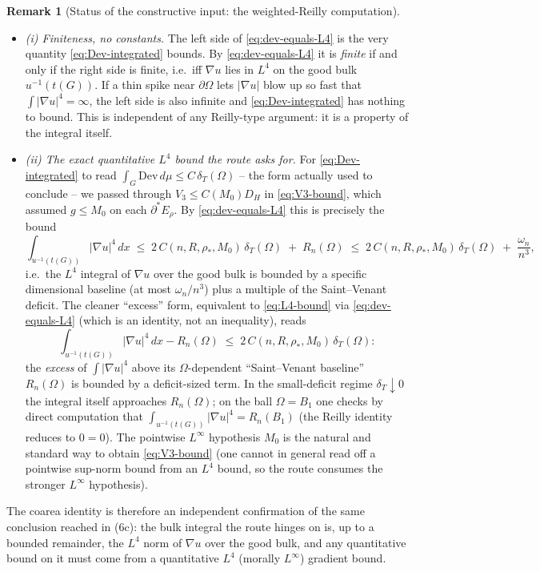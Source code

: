 \documentclass[11pt]{amsart}
\theoremstyle{definition}
\newtheorem{remark}[theorem]{Remark}
\newcommand{\Om}{\Omega}
\newcommand{\dT}{\delta_T}
\newcommand{\rstar}{\rho_*}
\begin{document}
\begin{remark}[Status of the constructive input: the weighted-Reilly computation]
\begin{itemize}[leftmargin=2em]
\item \emph{(i) Finiteness, no constants.}  The left side of
\eqref{eq:dev-equals-L4} is the very quantity \eqref{eq:Dev-integrated} bounds.
By \eqref{eq:dev-equals-L4} it is \emph{finite} if and only if the right side is
finite, i.e.\ iff \(\nabla u\) lies in \(L^4\) on the good bulk
\(u^{-1}(t(G))\).  If a thin spike near \(\partial\Om\) lets \(|\nabla u|\) blow
up so fast that \(\int|\nabla u|^4=\infty\), the left side is also infinite and
\eqref{eq:Dev-integrated} has nothing to bound.  This is independent of any
Reilly-type argument: it is a property of the integral itself.
\item \emph{(ii) The exact quantitative \(L^4\) bound the route asks for.}
For \eqref{eq:Dev-integrated} to read
\(\int_G\mathrm{Dev}\,d\mu\le C\,\dT(\Om)\) -- the form actually used to
conclude -- we passed through \(V_3\le C(M_0)D_H\) in \eqref{eq:V3-bound},
which assumed \(g\le M_0\) on each \(\partial^*E_\rho\).  By
\eqref{eq:dev-equals-L4} this is precisely the bound
\begin{equation}\label{eq:L4-bound}
   \int_{u^{-1}(t(G))}|\nabla u|^4\,dx
   \;\le\;
   2\,C(n,R,\rstar,M_0)\,\dT(\Om)\;+\;R_n(\Om)
   \;\le\;
   2\,C(n,R,\rstar,M_0)\,\dT(\Om)\;+\;\frac{\omega_n}{n^3} ,
\end{equation}
i.e.\ the \(L^4\) integral of \(\nabla u\) over the good bulk is bounded by a
specific dimensional baseline (at most \(\omega_n/n^3\)) plus a multiple of the
Saint--Venant deficit.  The cleaner ``excess'' form, equivalent to
\eqref{eq:L4-bound} via \eqref{eq:dev-equals-L4} (which is an identity, not an
inequality), reads
\[
   \int_{u^{-1}(t(G))}|\nabla u|^4\,dx-R_n(\Om)
   \;\le\;2\,C(n,R,\rstar,M_0)\,\dT(\Om):
\]
the \emph{excess} of \(\int|\nabla u|^4\) above its \(\Om\)-dependent
``Saint--Venant baseline'' \(R_n(\Om)\) is bounded by a deficit-sized term.
In the small-deficit regime \(\dT\downarrow0\) the integral itself approaches
\(R_n(\Om)\); on the ball \(\Om=B_1\) one checks by direct computation that
\(\int_{u^{-1}(t(G))}|\nabla u|^4=R_n(B_1)\) (the Reilly identity reduces to
\(0=0\)).  The pointwise \(L^\infty\) hypothesis \(M_0\) is the natural and
standard way to obtain \eqref{eq:V3-bound} (one cannot in general read off a
pointwise sup-norm bound from an \(L^4\) bound, so the route consumes the
stronger \(L^\infty\) hypothesis).
\end{itemize}
The coarea identity is therefore an independent confirmation of the same
conclusion reached in (6c): the bulk integral the route hinges on is, up to a
bounded remainder, the \(L^4\) norm of \(\nabla u\) over the good bulk, and any
quantitative bound on it must come from a quantitative \(L^4\) (morally
\(L^\infty\)) gradient bound.


\end{remark}
\end{document}
